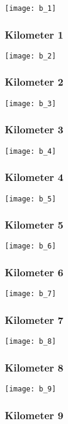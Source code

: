 \documentclass[]{article}
\begin{document}
\texttt{[image: b\_1]}

\subsubsection{Kilometer 1}\label{kilometer-1-1}

\texttt{[image: b\_2]}

\subsubsection{Kilometer 2}\label{kilometer-2-1}

\texttt{[image: b\_3]}

\subsubsection{Kilometer 3}\label{kilometer-3-1}

\texttt{[image: b\_4]}

\subsubsection{Kilometer 4}\label{kilometer-4-1}

\texttt{[image: b\_5]}

\subsubsection{Kilometer 5}\label{kilometer-5-1}

\texttt{[image: b\_6]}

\subsubsection{Kilometer 6}\label{kilometer-6-1}

\texttt{[image: b\_7]}

\subsubsection{Kilometer 7}\label{kilometer-7-1}

\texttt{[image: b\_8]}

\subsubsection{Kilometer 8}\label{kilometer-8-1}

\texttt{[image: b\_9]}

\subsubsection{Kilometer 9}\label{kilometer-9-1}
\end{document}
